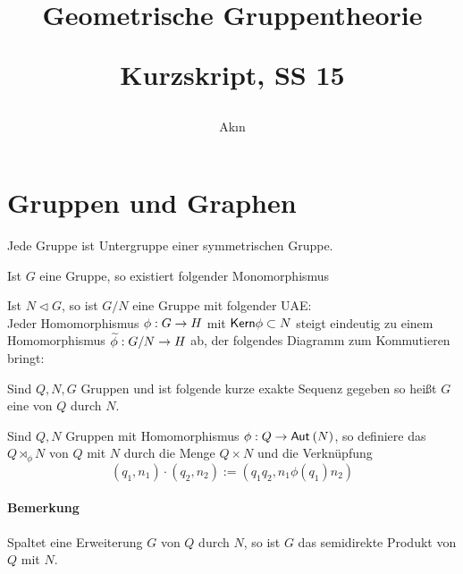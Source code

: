 \documentclass{article}
\newcommand{\normal}{\vartriangleleft}
\newcommand{\tm}{\subset}
\begin{document}
\title{
	\begin{huge}
		Geometrische Gruppentheorie\\
	\end{huge}
	\begin{large}
		Kurzskript, SS 15
\end{large}}


\author{Ak\i n}
\maketitle
\renewcommand{\i}{^{-1}}


\setcounter{tocdepth}{1}
\tableofcontents

\newpage
\section{Gruppen und Graphen}
Jede Gruppe ist Untergruppe einer symmetrischen Gruppe.
\begin{Beweis}{}
Ist $G$ eine Gruppe, so existiert folgender Monomorphismus
\end{Beweis}
Ist $N\normal G $, so ist $G/N$ eine Gruppe mit folgender UAE:\\
Jeder Homomorphismus $\phi : G \overset{}{\rightarrow} H$ mit $\Ker \phi \tm N $ steigt eindeutig zu einem Homomorphismus $\widetilde{\phi} : G/N \overset{}{\rightarrow} H$ ab, der folgendes Diagramm zum Kommutieren bringt:
\begin{center}
\end{center}

Sind $Q,N,G$ Gruppen und ist folgende kurze exakte Sequenz gegeben
so heißt $G$ eine  von $Q$ durch $N$.

Sind $Q,N$ Gruppen mit Homomorphismus $\phi : Q \overset{}{\rightarrow} \textsf{Aut}_{}\left(N\right)$, so definiere das  $Q\rtimes_\phi N$ von $Q$ mit $N$ durch die Menge $Q\times N$ und die Verknüpfung
\[ (q_1,n_1) \cdot (q_2, n_2) := (q_1q_2, n_1 \phi(q_1) n_2 ) \]
\paragraph{Bemerkung}
Spaltet eine Erweiterung $G$ von $Q$ durch $N$, so ist $G$ das semidirekte Produkt von $Q$ mit $N$.
\end{document}

